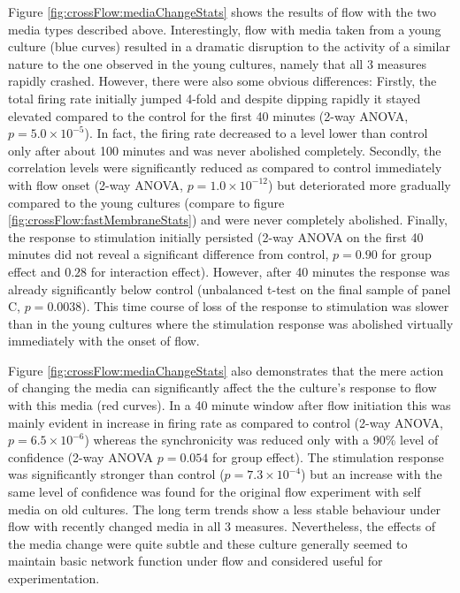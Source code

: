         Figure \ref{fig:crossFlow:mediaChangeStats} shows the results of flow with the two media types described above. Interestingly, flow with media taken from a young culture (blue curves) resulted in a dramatic disruption to the activity of a similar nature to the one observed in the young cultures, namely that all 3 measures rapidly crashed. However, there were also some obvious differences: Firstly, the total firing rate initially jumped 4-fold and despite dipping rapidly it stayed elevated compared to the control for the first 40 minutes (2-way ANOVA, \(p=5.0\times 10^{-5}\)). In fact, the firing rate decreased to a level lower than control only after about 100 minutes and was never abolished completely. Secondly, the correlation levels were significantly reduced as compared to control immediately with flow onset (2-way ANOVA, \(p=1.0\times 10^{-12}\)) but deteriorated more gradually compared to the young cultures (compare to figure \ref{fig:crossFlow:fastMembraneStats}) and were never completely abolished. Finally, the response to stimulation initially persisted (2-way ANOVA on the first 40 minutes did not reveal a significant difference from control, \(p=0.90\) for group effect and \(0.28\) for interaction effect). However, after 40 minutes the response was already significantly below control (unbalanced t-test on the final sample of panel C, \(p=0.0038\)). This time course of loss of the response to stimulation was slower than in the young cultures where the stimulation response was abolished virtually immediately with the onset of flow.

        Figure \ref{fig:crossFlow:mediaChangeStats} also demonstrates that the mere action of changing the media can significantly affect the the culture's response to flow with this media (red curves). In a 40 minute window after flow initiation this was mainly evident in increase in firing rate as compared to control (2-way ANOVA, \(p=6.5\times 10^{-6}\)) whereas the synchronicity was reduced only with a 90\% level of confidence (2-way ANOVA \(p=0.054\) for group effect). The stimulation response was significantly stronger than control (\(p=7.3\times 10^{-4}\)) but an increase with the same level of confidence was found for the original flow experiment with self media on old cultures. The long term trends show a less stable behaviour under flow with recently changed media in all 3 measures. Nevertheless, the effects of the media change were quite subtle and these culture generally seemed to maintain basic network function under flow and considered useful for experimentation.

